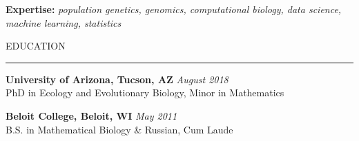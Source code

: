 \documentclass{resume} %
\renewenvironment{rSection}[1]{
\sectionskip
\textcolor{RoyalPurple}{\MakeUppercase{#1}}
\sectionlineskip
\hrule
\begin{list}{}{
\setlength{\leftmargin}{1.5em}
}
\item[]
}{
\end{list}
}
\begin{document}

\textcolor{RoyalPurple}{\bf Expertise:}
\textcolor{RoyalPurple}{\em population genetics, genomics, computational biology, data science, machine learning, statistics}

\begin{rSection}{Education}

{\bf University of Arizona, Tucson, AZ} \hfill {\em August 2018} \\ 
PhD in Ecology and Evolutionary Biology, Minor in Mathematics 

{\bf Beloit College, Beloit, WI} \hfill {\em May 2011} \\ 
B.S. in Mathematical Biology \& Russian, Cum Laude

\end{rSection}

\end{document}

